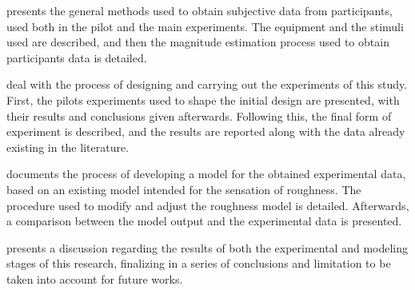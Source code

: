 \documentclass[../main.tex]{subfiles}
\begin{document}
 presents the general methods used to obtain subjective data
from participants, used both in the pilot and the main experiments. The
equipment and the stimuli used are described, and then the magnitude estimation
process used to obtain participants data is detailed.

 deal with the process of designing and carrying
out the experiments of this study. First, the pilots experiments used to shape
the initial design are presented, with their results and conclusions given
afterwards. Following this, the final form of experiment is described, and the
results are reported along with the data already existing in the literature.

 documents the process of developing a model for the obtained
experimental data, based on an existing model intended for the sensation of
roughness. The procedure used to modify and adjust the roughness model is
detailed. Afterwards, a comparison between the model output and the
experimental data is presented.

 presents a discussion regarding the results of both the
experimental and modeling stages of this research, finalizing in a series of
conclusions and limitation to be taken into account for future works.
\end{document}
